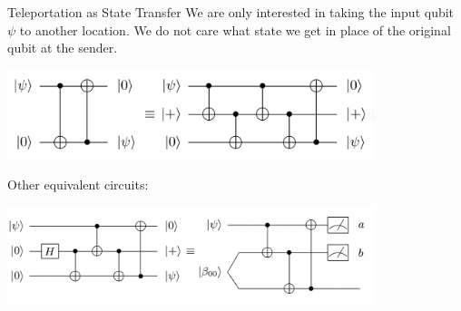 \begin{frame}{Teleportation as State Transfer}
We are only interested in taking the input qubit $\psi$ to another location. We do not care what state we get in place of the original qubit at the sender. 

\begin{center}
    \includegraphics[width=0.80\textwidth]{img/state-transfer.png}
\end{center}

Other equivalent circuits:
\begin{center}
    \includegraphics[width=0.80\textwidth]{img/Other-teleportation.png}
\end{center}
\end{frame}